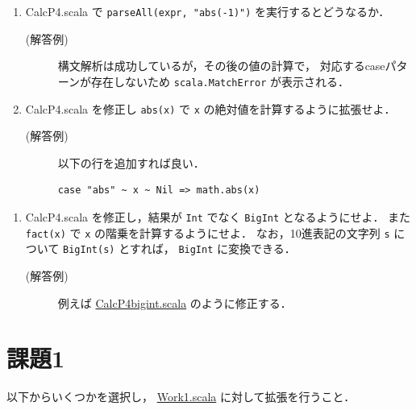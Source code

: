 \documentclass[a4j]{jsarticle}
\begin{document}
\begin{enumerate}
\item CalcP4.scala で \texttt{parseAll(expr, "abs(-1)")} を実行するとどうなるか．
\begin{description}
\item[(解答例)] 構文解析は成功しているが，その後の値の計算で，
       対応するcaseパターンが存在しないため \texttt{scala.MatchError} が表示される．
\end{description}
\item CalcP4.scala を修正し \texttt{abs(x)} で \texttt{x} の絶対値を計算するように拡張せよ．
\begin{description}
\item[(解答例)] 以下の行を追加すれば良い．

\begin{verbatim}
case "abs" ~ x ~ Nil => math.abs(x)
\end{verbatim}
\end{description}
\end{enumerate}
\begin{enumerate}
\item CalcP4.scala を修正し，結果が \texttt{Int} でなく \texttt{BigInt} となるようにせよ．
     また \texttt{fact(x)} で \texttt{x} の階乗を計算するようにせよ．
     なお，10進表記の文字列 \texttt{s} について \texttt{BigInt(s)} とすれば，
     \texttt{BigInt} に変換できる．
\begin{description}
\item[(解答例)] 例えば \href{file:///home/tamura/lect2/ProLang/2018/org/prog/parser/CalcP4bigint.scala}{CalcP4bigint.scala} のように修正する．
\end{description}
\end{enumerate}
\section{課題1}
\label{sec-5}

以下からいくつかを選択し， \href{file:///home/tamura/lect2/ProLang/2018/org/prog/parser/Work1.scala}{Work1.scala} に対して拡張を行うこと．
\end{document}
